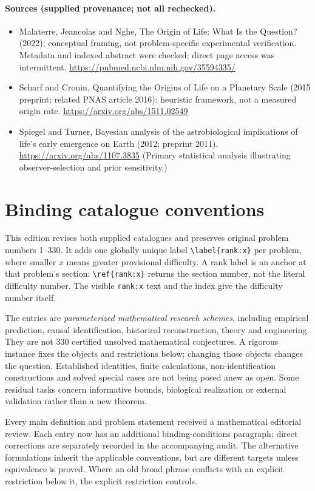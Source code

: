 \documentclass[11pt]{article}
\begin{document}
\paragraph{Sources (supplied provenance; not all rechecked).} \begin{itemize}
\item Malaterre, Jeancolas and Nghe, The Origin of Life: What Is the Question? (2022); conceptual framing, not problem-specific experimental verification. Metadata and indexed abstract were checked; direct page access was intermittent. \url{https://pubmed.ncbi.nlm.nih.gov/35594335/}
\item Scharf and Cronin, Quantifying the Origins of Life on a Planetary Scale (2015 preprint; related PNAS article 2016); heuristic framework, not a measured origin rate. \url{https://arxiv.org/abs/1511.02549}
\item Spiegel and Turner, Bayesian analysis of the astrobiological implications of life's early emergence on Earth (2012; preprint 2011). \url{https://arxiv.org/abs/1107.3835} (Primary statistical analysis illustrating observer-selection and prior sensitivity.)
\end{itemize}


\section*{Binding catalogue conventions}
This edition revises both supplied catalogues and preserves original problem numbers 1--330. It adds one globally unique label \verb|\label{rank:x}| per problem, where smaller $x$ means greater provisional difficulty. A rank label is an anchor at that problem's section: \verb|\ref{rank:x}| returns the section number, not the literal difficulty number. The visible \texttt{rank:x} text and the index give the difficulty number itself.

The entries are \emph{parameterized mathematical research schemes}, including empirical prediction, causal identification, historical reconstruction, theory and engineering. They are not 330 certified unsolved mathematical conjectures. A rigorous instance fixes the objects and restrictions below; changing those objects changes the question. Established identities, finite calculations, non-identification constructions and solved special cases are not being posed anew as open. Some residual tasks concern informative bounds, biological realization or external validation rather than a new theorem.

Every main definition and problem statement received a mathematical editorial review. Each entry now has an additional binding-conditions paragraph; direct corrections are separately recorded in the accompanying audit. The alternative formulations inherit the applicable conventions, but are different targets unless equivalence is proved. Where an old broad phrase conflicts with an explicit restriction below it, the explicit restriction controls.
\end{document}
